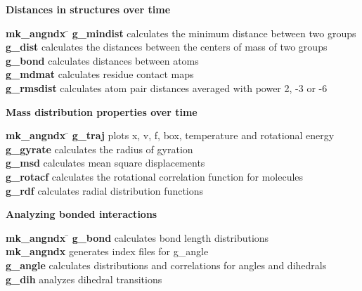 \begin{description}
\item {\large\bf Distances in structures over time}
\vspace{-2ex}\begin{tabbing}
{\bf mk\_angndx} \= \kill
{\bf g\_mindist} \> calculates the minimum distance between two groups \\
{\bf g\_dist} \> calculates the distances between the centers of mass of two groups \\
{\bf g\_bond} \> calculates distances between atoms \\
{\bf g\_mdmat} \> calculates residue contact maps \\
{\bf g\_rmsdist} \> calculates atom pair distances averaged with power 2, -3 or -6 \\
\end{tabbing}\vspace{-2ex}

\item {\large\bf Mass distribution properties over time}
\vspace{-2ex}\begin{tabbing}
{\bf mk\_angndx} \= \kill
{\bf g\_traj} \> plots x, v, f, box, temperature and rotational energy \\
{\bf g\_gyrate} \> calculates the radius of gyration \\
{\bf g\_msd} \> calculates mean square displacements \\
{\bf g\_rotacf} \> calculates the rotational correlation function for molecules \\
{\bf g\_rdf} \> calculates radial distribution functions \\
\end{tabbing}\vspace{-2ex}

\item {\large\bf Analyzing bonded interactions}
\vspace{-2ex}\begin{tabbing}
{\bf mk\_angndx} \= \kill
{\bf g\_bond} \> calculates bond length distributions \\
{\bf mk\_angndx} \> generates index files for g\_angle \\
{\bf g\_angle} \> calculates distributions and correlations for angles and dihedrals \\
{\bf g\_dih} \> analyzes dihedral transitions \\
\end{tabbing}\vspace{-2ex}


\end{description}
